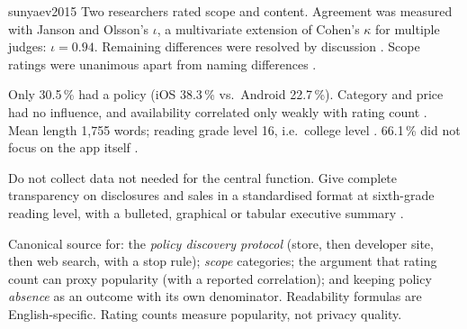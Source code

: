 \begin{papercard}{sunyaev2015}
 Two researchers rated scope and content. Agreement was measured with Janson and Olsson's $\iota$, a multivariate extension of Cohen's $\kappa$ for multiple judges: $\iota = 0.94$. Remaining differences were resolved by discussion . Scope ratings were unanimous apart from naming differences .

 Only 30.5\,\% had a policy (iOS 38.3\,\% vs.\ Android 22.7\,\%). Category and price had no influence, and availability correlated only weakly with rating count . Mean length 1{,}755 words; reading grade level 16, i.e.\ college level . 66.1\,\% did not focus on the app itself .

 Do not collect data not needed for the central function. Give complete transparency on disclosures and sales in a standardised format at sixth-grade reading level, with a bulleted, graphical or tabular executive summary .

 Canonical source for: the \emph{policy discovery protocol} (store, then developer site, then web search, with a stop rule); \emph{scope} categories; the argument that rating count can proxy popularity (with a reported correlation); and keeping policy \emph{absence} as an outcome with its own denominator. Readability formulas are English-specific. Rating counts measure popularity, not privacy quality.
\end{papercard}
